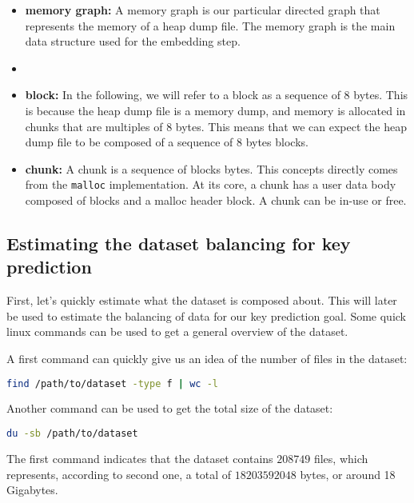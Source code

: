     \begin{itemize}
        \item \textbf{memory graph:} A memory graph is our particular directed graph that represents the memory of a heap dump file. The memory graph is the main data structure used for the embedding step.
        \item \item \textbf{block:} In the following, we will refer to a block as a sequence of 8 bytes. This is because the heap dump file is a memory dump, and memory is allocated in chunks that are multiples of 8 bytes. This means that we can expect the heap dump file to be composed of a sequence of 8 bytes blocks.
        \item \textbf{chunk:} A chunk is a sequence of blocks bytes. This concepts directly comes from the \lstinline[language=c]|malloc| implementation. At its core, a chunk has a user data body composed of blocks and a malloc header block. A chunk can be in-use or free.
    \end{itemize}

    \subsection{Estimating the dataset balancing for key prediction}
    First, let's quickly estimate what the dataset is composed about. This will later be used to estimate the balancing of data for our key prediction goal. Some quick linux commands can be used to get a general overview of the dataset.
    
    A first command can quickly give us an idea of the number of files in the dataset:
    \begin{lstlisting}[caption={Count all dataset files}, label=methods:code:count_all_dataset_files, language=bash]
        find /path/to/dataset -type f | wc -l
    \end{lstlisting}

    Another command can be used to get the total size of the dataset:
    \begin{lstlisting}[caption={Get the total size of the dataset}, label=methods:code:get_total_size_dataset, language=bash]
        du -sb /path/to/dataset
    \end{lstlisting}

    The first command indicates that the dataset contains $ 208749 $ files, which represents, according to second one, a total of $ 18203592048 $ bytes, or around 18 Gigabytes.

